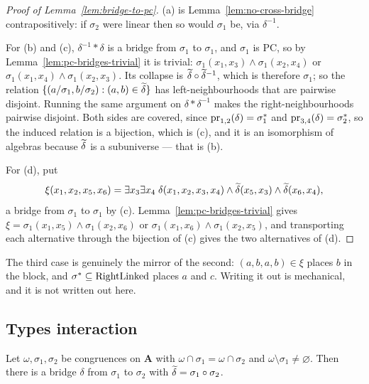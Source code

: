\begin{proof}[Proof of Lemma~\ref{lem:bridge-to-pc}]
(a) is Lemma~\ref{lem:no-cross-bridge} contrapositively: if $\sigma_{2}$ were
linear then so would $\sigma_{1}$ be, via $\delta^{-1}$.

For (b) and (c), $\delta^{-1}\ast\delta$ is a bridge from $\sigma_{1}$ to
$\sigma_{1}$, and $\sigma_{1}$ is PC, so by
Lemma~\ref{lem:pc-bridges-trivial} it is trivial:
$\sigma_{1}(x_{1},x_{3})\wedge\sigma_{1}(x_{2},x_{4})$ or
$\sigma_{1}(x_{1},x_{4})\wedge\sigma_{1}(x_{2},x_{3})$. Its collapse is
$\widetilde{\delta}\circ\widetilde{\delta}^{-1}$, which is therefore $\sigma_{1}$; so the
relation $\{(a/\sigma_{1},b/\sigma_{2}):(a,b)\in\widetilde{\delta}\}$ has
left-neighbourhoods that are pairwise disjoint. Running the same argument on
$\delta\ast\delta^{-1}$ makes the right-neighbourhoods pairwise disjoint. Both
sides are covered, since $\operatorname*{pr}_{1,2}(\delta)=\sigma_{1}^{*}$ and
$\operatorname*{pr}_{3,4}(\delta)=\sigma_{2}^{*}$, so the induced relation is a
bijection, which is (c), and it is an isomorphism of algebras because
$\widetilde{\delta}$ is a subuniverse --- that is (b).

For (d), put
\[
  \xi(x_{1},x_{2},x_{5},x_{6})=\exists x_{3}\exists x_{4}\;
    \delta(x_{1},x_{2},x_{3},x_{4})\wedge\widetilde{\delta}(x_{5},x_{3})\wedge
    \widetilde{\delta}(x_{6},x_{4}),
\]
a bridge from $\sigma_{1}$ to $\sigma_{1}$ by (c). Lemma~\ref{lem:pc-bridges-trivial}
gives $\xi=\sigma_{1}(x_{1},x_{5})\wedge\sigma_{1}(x_{2},x_{6})$ or
$\sigma_{1}(x_{1},x_{6})\wedge\sigma_{1}(x_{2},x_{5})$, and transporting each
alternative through the bijection of (c) gives the two alternatives of (d).
\end{proof}

\begin{hazard}\label{haz:pc-bridges-hedges}
The third case is genuinely the mirror of the second: $(a,b,a,b)\in\xi$ places
$b$ in the block, and $\sigma^{*}\subseteq\operatorname{RightLinked}$ places
$a$ and $c$. Writing it out is mechanical, and it is not written out here.
\end{hazard}

\subsection{Types interaction}\label{sec:types-interaction}

\begin{lemma}\label{lem:bridge-between-congruences}
Let $\omega,\sigma_{1},\sigma_{2}$ be congruences on $\mathbf A$ with
$\omega\cap\sigma_{1}=\omega\cap\sigma_{2}$ and
$\omega\setminus\sigma_{1}\neq\varnothing$. Then there is a bridge $\delta$
from $\sigma_{1}$ to $\sigma_{2}$ with $\widetilde{\delta}=\sigma_{1}\circ\sigma_{2}$.
\end{lemma}

